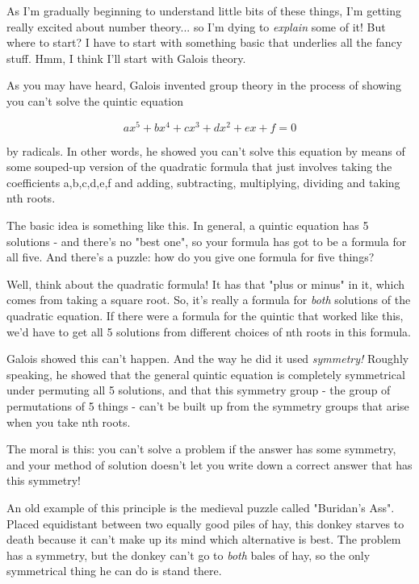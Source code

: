As I'm gradually beginning to understand little bits of these things, 
I'm getting really excited about number theory... so I'm dying to 
\emph{explain}
some of it!  But where to start?  I have to start with something basic that
underlies all the fancy stuff.  Hmm, I think I'll start with Galois theory.

As you may have heard, Galois invented group theory in the process of
showing you can't solve the quintic equation


$$

ax^{5} + bx^{4} + cx^{3} + dx^{2} + ex + f = 0
$$
    
by radicals.  In other words, he showed you can't solve this equation 
by means of some souped-up version of the quadratic formula that just 
involves taking the coefficients a,b,c,d,e,f and adding, subtracting, 
multiplying, dividing and taking nth roots.
  
The basic idea is something like this.  In general, a quintic equation 
has 5 solutions - and there's no "best one", so your formula has 
got to 
be a formula for all five.  And there's a puzzle: how do you give one 
formula for five things?  

Well, think about the quadratic formula!   It has that "plus 
or minus" 
in it, which comes from taking a square root.  So, it's really a formula 
for \emph{both} solutions of the quadratic equation.  If there were a formula 
for the quintic that worked like this, we'd have to get all 5 solutions 
from different choices of nth roots in this formula.

Galois showed this can't happen.  And the way he did it used \emph{symmetry!}
Roughly speaking, he showed that the general quintic equation is completely 
symmetrical under permuting all 5 solutions, and that this symmetry group - 
the group of permutations of 5 things - can't be built up from the symmetry
groups that arise when you take nth roots.  

The moral is this: you can't solve a problem if the answer has some 
symmetry, and your method of solution doesn't let you write down a correct
answer that has this symmetry!   

An old example of this principle is the medieval puzzle called "Buridan's
Ass".  Placed equidistant between two equally good piles of hay, this
donkey starves to death because it can't make up its mind which alternative
is best.  The problem has a symmetry, but the donkey can't go to \emph{both}
bales of hay, so the only symmetrical thing he can do is stand there.  


